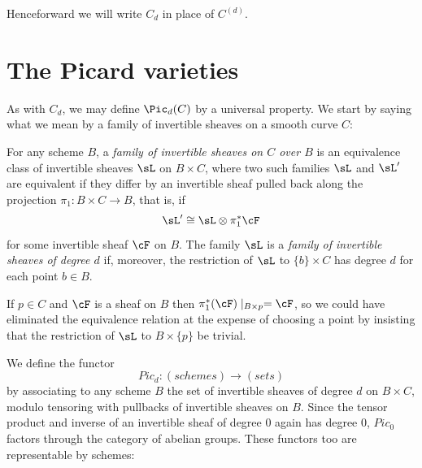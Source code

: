 Henceforward we will write $C_d$ in place of $C^{(d)}$.



\section{The Picard varieties}\label{Picard section}

As with $C_d$, we may define $\Pic_d(C)$ by a universal property. We start by saying what we mean by a family of invertible sheaves on a smooth curve $C$:

\begin{definition}
 For any scheme $B$, a \emph{family of invertible sheaves on $C$ over $B$} is an equivalence class of invertible sheaves $\sL$ on $B\times C$, where two such
 families $\sL$ and $\sL'$ are equivalent if they differ by an invertible sheaf pulled back along the projection $\pi_1: B\times C \to B$, that is, if
 $$
 \sL' \cong \sL \otimes \pi_1^*\cF
 $$
for some invertible sheaf $\cF$ on $B$.
The family $\sL$  is a \emph{family of invertible sheaves of degree $d$} if, moreover, the restriction of $\sL$
 to $\{b\}\times C$ has degree $d$ for each point $b\in B$. 
 \end{definition}

If $p \in C$ and $\cF$ is a sheaf on $B$ then $\pi_1^*(\cF)\mid_{B\times p} = \cF$, so we could have eliminated the
equivalence relation at the expense of choosing a point by insisting that the restriction of $\sL$ to $B \times \{p\}$ be trivial.
 
 

 

We define the functor
 $$
 Pic_d : (schemes) \to (sets)
 $$
 by associating to any scheme $B$ the set of invertible sheaves of degree $d$ on $B \times C$, modulo tensoring with pullbacks of invertible sheaves on $B$. Since the tensor product and inverse of an invertible sheaf of degree 0 again has degree 0, 
 $Pic_0$ factors through the category of abelian groups. These functors too are representable by schemes:
  
